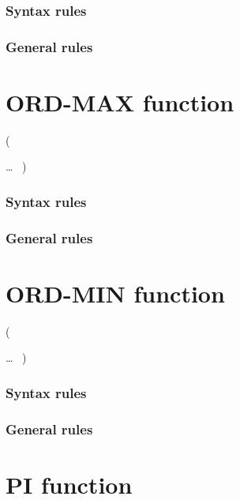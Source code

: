 \subsubsection{Syntax rules}

\subsubsection{General rules}

\section{ORD-MAX function}

\begin{syntax}
    (
  \begin{1=}
    \argument
  \end{1=} \ldots
  \ {})
\end{syntax}

\subsubsection{Syntax rules}

\subsubsection{General rules}

\section{ORD-MIN function}

\begin{syntax}
    (
  \begin{1=}
    \argument
  \end{1=} \ldots
  \ {})
\end{syntax}

\subsubsection{Syntax rules}

\subsubsection{General rules}

\section{PI function}

